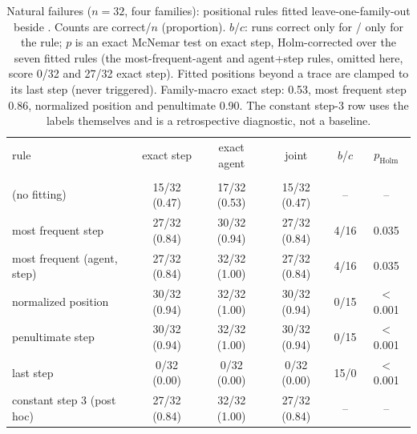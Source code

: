 \begin{table}[!t]
\caption{Natural failures ($n{=}32$, four families): positional rules fitted leave-one-family-out beside \pha{}. Counts are correct/$n$ (proportion). $b$/$c$: runs correct only for \pha{} / only for the rule; $p$ is an exact McNemar test on exact step, Holm-corrected over the seven fitted rules (the most-frequent-agent and agent+step rules, omitted here, score 0/32 and 27/32 exact step). Fitted positions beyond a trace are clamped to its last step (never triggered). Family-macro exact step: \pha{} 0.53, most frequent step 0.86, normalized position and penultimate 0.90. The constant step-3 row uses the labels themselves and is a retrospective diagnostic, not a baseline.}
\label{tab:positional}
\centering\scriptsize
\setlength{\tabcolsep}{3pt}
\begin{tabular}{lccccc}
\toprule
rule & exact step & exact agent & joint & $b$/$c$ & $p_{\mathrm{Holm}}$ \\\\
\midrule
\pha{} (no fitting) & 15/32 (0.47) & 17/32 (0.53) & 15/32 (0.47) & -- & -- \\
most frequent step & 27/32 (0.84) & 30/32 (0.94) & 27/32 (0.84) & 4/16 & 0.035 \\
most frequent (agent, step) & 27/32 (0.84) & 32/32 (1.00) & 27/32 (0.84) & 4/16 & 0.035 \\
normalized position & 30/32 (0.94) & 32/32 (1.00) & 30/32 (0.94) & 0/15 & $<$0.001 \\
penultimate step & 30/32 (0.94) & 32/32 (1.00) & 30/32 (0.94) & 0/15 & $<$0.001 \\
last step & 0/32 (0.00) & 0/32 (0.00) & 0/32 (0.00) & 15/0 & $<$0.001 \\
constant step 3 (post hoc) & 27/32 (0.84) & 32/32 (1.00) & 27/32 (0.84) & -- & -- \\
\bottomrule
\end{tabular}
\end{table}
